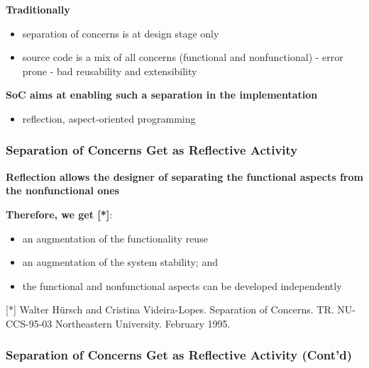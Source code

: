 \textbf{Traditionally}

\begin{itemize}
	\item separation of concerns is at design stage only
	\item source code is a mix of all concerns (functional and nonfunctional)
		- error prone
		- bad reusability and extensibility
\end{itemize}

\textbf{SoC aims at enabling such a separation in the implementation}

\begin{itemize}
	\item reflection, aspect-oriented programming
\end{itemize}

\subsubsection{Separation of Concerns Get as Reflective Activity}

\textbf{Reflection allows the designer of separating the functional aspects from the nonfunctional ones}

\textbf{Therefore, we get [*]}:
\begin{itemize}
	\item an augmentation of the functionality reuse
	\item an augmentation of the system stability; and
	\item the functional and nonfunctional aspects can be developed independently
\end{itemize}

[*] Walter Hürsch and Cristina Videira-Lopes. Separation of Concerns. TR. NU-CCS-95-03 Northeastern University. February 1995.

\subsubsection{Separation of Concerns Get as Reflective Activity (Cont'd)}

\begin{center}
\end{center}















